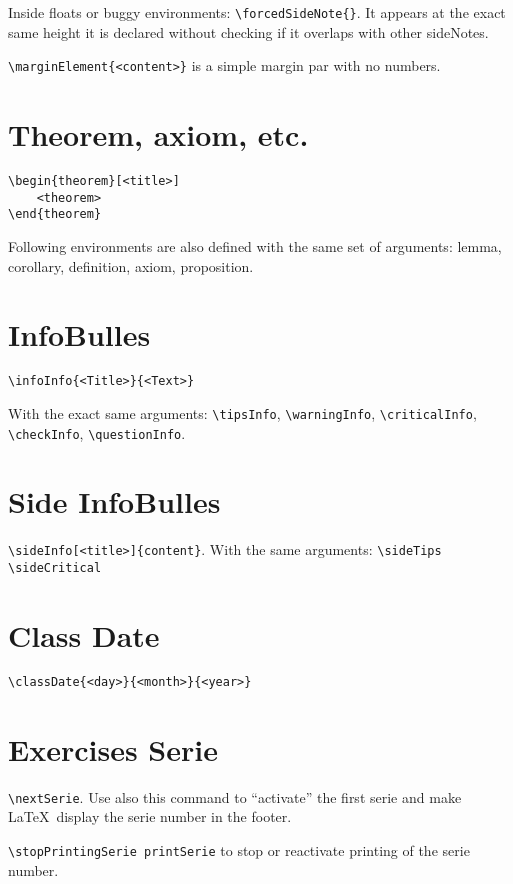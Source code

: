 \documentclass[a4paper, 11pt, oneside, fleqn]{article}
\begin{document}
\begin{multicols}{2}
		Inside floats or buggy environments: \lstinline[breaklines]|\forcedSideNote{}|. It appears at the exact same height it is declared without checking if it overlaps with other sideNotes.
		
		\lstinline[breaklines]|\marginElement{<content>}| is a simple margin par with no numbers.
		
		
		\section{Theorem, axiom, etc.}
		\begin{lstlisting}[breaklines]
\begin{theorem}[<title>]
	<theorem>
\end{theorem}
		\end{lstlisting}
		
		Following environments are also defined with the same set of arguments: lemma, corollary, definition, axiom, proposition.
		
		
		\section{InfoBulles}
		\verb|\infoInfo{<Title>}{<Text>}|
		
		With the exact same arguments: \verb|\tipsInfo|, \verb|\warningInfo|, \verb|\criticalInfo|,
		\verb|\checkInfo|, \verb|\questionInfo|.
		
		
		\section{Side InfoBulles}
		\lstinline[breaklines]|\sideInfo[<title>]{content}|. With the same arguments: \lstinline[breaklines]|\sideTips \sideCritical|
		
		
		\section{Class Date}
		\lstinline[breaklines]|\classDate{<day>}{<month>}{<year>}|
		
		
		\section{Exercises Serie}
		\lstinline[breaklines]|\nextSerie|. Use also this command to \enquote{activate} the first serie and make \LaTeX\ display the serie number in the footer.
		
		\lstinline[breaklines]|\stopPrintingSerie printSerie| to stop or reactivate printing of the serie number.
		

\end{multicols}
\end{document}
